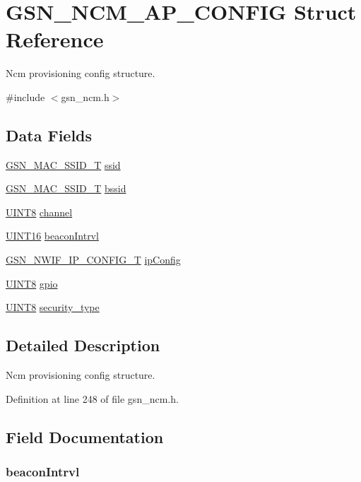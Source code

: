 \hypertarget{a00156}{
\section{GSN\_\-NCM\_\-AP\_\-CONFIG Struct Reference}
\label{a00156}
}


Ncm provisioning config structure.  




{\ttfamily \#include $<$gsn\_\-ncm.h$>$}

\subsection*{Data Fields}
\begin{DoxyCompactItemize}
\item 
\hyperlink{a00417}{GSN\_\-MAC\_\-SSID\_\-T} \hyperlink{a00156_a1bc7788a828e29446580aa10a5ac2932}{ssid}
\item 
\hyperlink{a00417}{GSN\_\-MAC\_\-SSID\_\-T} \hyperlink{a00156_ad8607c5127fe55daa3cb20175af535c6}{bssid}
\item 
\hyperlink{a00660_gab27e9918b538ce9d8ca692479b375b6a}{UINT8} \hyperlink{a00156_a52d69a3bd7bdfdfc6f9e40f4962c575d}{channel}
\item 
\hyperlink{a00660_ga09f1a1fb2293e33483cc8d44aefb1eb1}{UINT16} \hyperlink{a00156_a4adf7cd14b3bc4cf5ace4ba5edea3f1a}{beaconIntrvl}
\item 
\hyperlink{a00172}{GSN\_\-NWIF\_\-IP\_\-CONFIG\_\-T} \hyperlink{a00156_a1dede6b9b16f28827ae79e82aba27440}{ipConfig}
\item 
\hyperlink{a00660_gab27e9918b538ce9d8ca692479b375b6a}{UINT8} \hyperlink{a00156_a458bbee8aed8c92436e82f0d7a969f6a}{gpio}
\item 
\hyperlink{a00660_gab27e9918b538ce9d8ca692479b375b6a}{UINT8} \hyperlink{a00156_a21e76f719b06d1894aaf4cafcb6442ff}{security\_\-type}
\end{DoxyCompactItemize}


\subsection{Detailed Description}
Ncm provisioning config structure. 

Definition at line 248 of file gsn\_\-ncm.h.



\subsection{Field Documentation}
\hypertarget{a00156_a4adf7cd14b3bc4cf5ace4ba5edea3f1a}{
\subsubsection[{beaconIntrvl}]{ {\bf beaconIntrvl}}}
\label{a00156_a4adf7cd14b3bc4cf5ace4ba5edea3f1a}


